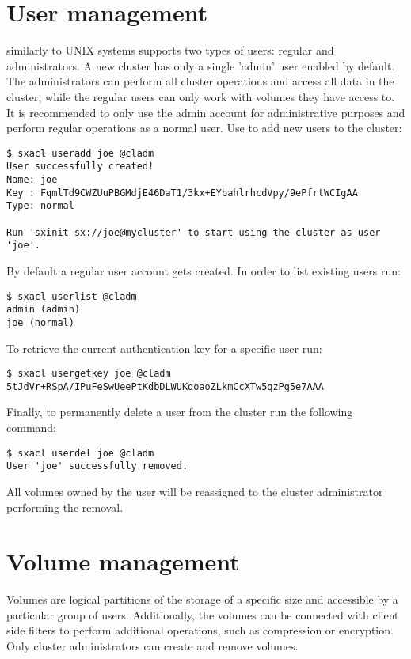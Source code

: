 \section{User management}
\SX similarly to UNIX systems supports two types of users: regular and
administrators. A new cluster has only a single 'admin' user enabled by
default. The administrators can perform all cluster operations and access
all data in the cluster, while the regular users can only work with volumes
they have access to. It is recommended to only use the admin account for
administrative purposes and perform regular operations as a normal user.
Use  to add new users to the cluster:
\begin{lstlisting}
$ sxacl useradd joe @cladm
User successfully created!
Name: joe
Key : FqmlTd9CWZUuPBGMdjE46DaT1/3kx+EYbahlrhcdVpy/9ePfrtWCIgAA
Type: normal

Run 'sxinit sx://joe@mycluster' to start using the cluster as user 'joe'.
\end{lstlisting}
By default a regular user account gets created. In order to list existing
users run:
\begin{lstlisting}
$ sxacl userlist @cladm
admin (admin)
joe (normal)
\end{lstlisting}
To retrieve the current authentication key for a specific user run:
\begin{lstlisting}
$ sxacl usergetkey joe @cladm
5tJdVr+RSpA/IPuFeSwUeePtKdbDLWUKqoaoZLkmCcXTw5qzPg5e7AAA
\end{lstlisting}
Finally, to permanently delete a user from the cluster run the following
command:
\begin{lstlisting}
$ sxacl userdel joe @cladm
User 'joe' successfully removed.
\end{lstlisting}
All volumes owned by the user will be reassigned to the cluster administrator performing the removal.

\section{Volume management}
Volumes are logical partitions of the \SX storage of a specific size and accessible
by a particular group of users. Additionally, the volumes can be connected with client
side filters to perform additional operations, such as compression or encryption.
Only cluster administrators can create and remove volumes.

